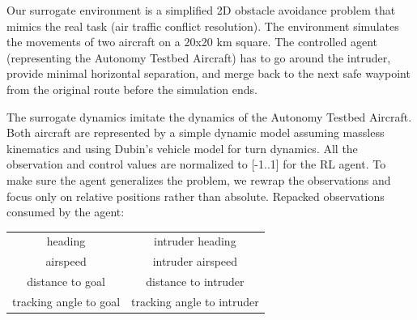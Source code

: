 Our surrogate environment is a simplified 2D obstacle avoidance problem that mimics the real task (air traffic conflict resolution). 
The environment simulates the movements of two aircraft on a 20x20 km square. The controlled agent (representing the Autonomy Testbed Aircraft) has to go around the intruder, provide minimal horizontal separation, and merge back to the next safe waypoint from the original route before the simulation ends.



The surrogate dynamics imitate the dynamics of the Autonomy Testbed Aircraft.
Both aircraft are represented by a simple dynamic model assuming massless kinematics and using Dubin's vehicle model for turn dynamics.
All the observation and control values are normalized to [-1..1] for the RL agent.
To make sure the agent generalizes the problem, we rewrap the observations and focus only on 
relative positions rather than absolute.  Repacked observations consumed by the agent:
	\begin{center}
		\begin{tabular}{|| c | c ||} 
			\hline
			heading & intruder heading\\
			airspeed & intruder airspeed\\
			distance to goal & distance to intruder\\
			tracking angle to goal & tracking angle to intruder\\
			\hline
		\end{tabular}
	\end{center}

